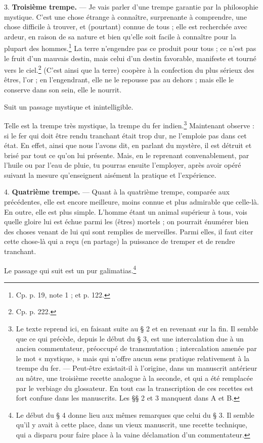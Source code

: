 \documentclass[a4paper, 11pt, oneside, polutonikogreek, french]{article}
\begin{document}
3. \textbf{Troisième trempe.} --- Je vais parler d'une trempe garantie par la philosophie mystique. C'est une chose étrange à connaître, surprenante à comprendre, une chose difficile à trouver, et (pourtant) connue de tous ; elle est recherchée avec ardeur, en raison de sa nature et bien qu'elle soit facile à connaître pour la plupart des hommes.\footnote{Cp. p. 19, note 1 ; et p. 122.} La terre n'engendre pas ce produit pour tous ; ce n'est pas le fruit d'un mauvais destin, mais celui d'un destin favorable, manifeste et tourné vers le ciel.\footnote{Cp. p. 222.} (C'est ainsi que la terre) coopère à la confection du plus sérieux des êtres, l'or ; en l'engendrant, elle ne le repousse pas au dehors ; mais elle le conserve dans son sein, elle le nourrit.

Suit un passage mystique et inintelligible.

Telle est la trempe très mystique, la trempe du fer indien.\footnote{Le texte reprend ici, en faisant suite au § 2 et en revenant sur la fin. Il semble que ce qui précède, depuis le début du § 3, est une intercalation due à un ancien commentateur, préoccupé de transmutation ; intercalation amenée par le mot « mystique, » mais qui n'offre aucun sens pratique relativement à la trempe du fer. --- Peut-être existait-il à l'origine, dans un manuscrit antérieur au nôtre, une troisième recette analogue à la seconde, et qui a été remplacée par le verbiage du glossateur. En tout cas la transcription de ces recettes est fort confuse dans les manuscrits. Les §§ 2 et 3 manquent dans A et B.} Maintenant observe : si le fer qui doit être rendu tranchant était trop dur, ne l'emploie pas dans cet état. En effet, ainsi que nous l'avons dit, en parlant du mystère, il est détruit et brisé par tout ce qu'on lui présente. Mais, en le reprenant convenablement, par l'huile ou par l'eau de pluie, tu pourras ensuite l'employer, après avoir opéré suivant la mesure qu'enseignent aisément la pratique et l'expérience.

4. \textbf{Quatrième trempe.} --- Quant à la quatrième trempe, comparée aux précédentes, elle est encore meilleure, moins connue et plus admirable que celle-là. En outre, elle est plus simple. L'homme étant un animal supérieur à tous, vois quelle gloire lui est échue parmi les (êtres) mortels ; on pourrait énumérer bien des choses venant de lui qui sont remplies de merveilles. Parmi elles, il faut citer cette chose-là qui a reçu (en partage) la puissance de tremper et de rendre tranchant.

Le passage qui suit est un pur galimatias.\footnote{Le début du § 4 donne lieu aux mêmes remarques que celui du § 3. Il semble qu'il y avait à cette place, dans un vieux manuscrit, une recette technique, qui a disparu pour faire place à la vaine déclamation d'un commentateur.}
\end{document}
